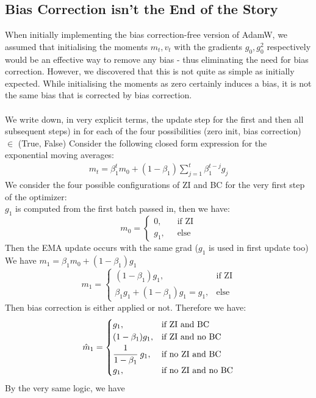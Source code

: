 \documentclass[12pt]{book}
\begin{document}
\subsection*{Bias Correction isn't the End of the Story}
When initially implementing the bias correction-free version of AdamW, we assumed that initialising the moments $m_t, v_t$ with the gradients  $g_0, g_0^2$ respectively would be an effective way to remove any bias - thus eliminating the need for bias correction. However, we discovered that this is not quite as simple as initially expected. While initialising the moments as zero certainly induces a bias, it is not the same bias that is corrected by bias correction. \\
\\
We write down, in very explicit terms, the update step for the first and then all subsequent steps) in for each of the four possibilities (zero init, bias correction) $\in $ (True, False)
Consider the following closed form expression for the exponential moving averages:
\begin{align*}
m_t = \beta_1^{t}m_0 + (1-\beta_1)\sum_{j=1}^{t} {\beta_1^{t-j}g_j}
\end{align*}
We consider the four possible configurations of ZI and BC for the very first step of the optimizer:
\\
$g_1$ is computed from the first batch passed in, then we have:
 \[
m_0 = \begin{cases}
	0, \quad &\text{if ZI}\\
	g_1, &\text{else}

\end{cases}
\]
Then the EMA update occurs with the same grad ($g_1$ is used in first update too)\\
We have $m_1 = \beta_1m_0 + (1-\beta_1)g_1$
\[
m_{1}= \begin{cases}
	(1-\beta_1)g_1, \quad &\text{if ZI}\\
	\beta_1g_1 + (1-\beta_1)g_1 = g_1, &\text{else}

\end{cases}
\]
Then bias correction is either applied or not. Therefore we have:
\[
\hat{m}_1 = \begin{cases}
	g_1, &\text{if ZI and BC}\\
	(1-\beta_1)g_1, &\text{if ZI and no BC}\\
	\cfrac{1}{1-\beta_1}\ g_1, &\text{if no ZI and BC}\\
	g_1, &\text{if no ZI and no BC}
\end{cases}
\] 
By the very same logic, we have 
\end{document}
